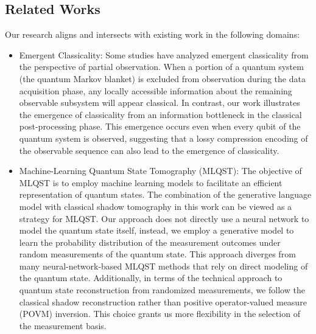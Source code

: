 \documentclass[fleqn,11pt]{wlscirep}
\begin{document}
\subsection*{Related Works}

Our research aligns and intersects with existing work in the following domains:
\begin{itemize}
\item Emergent Classicality: Some studies \cite{Brandao2015G1310.8640, Foti2019W1810.10261, Qi2021E2001.01507, Coppo2022T2203.13587} have analyzed emergent classicality from the perspective of partial observation. When a portion of a quantum system (the quantum Markov blanket) is excluded from observation during the data acquisition phase, any locally accessible information about the remaining observable subsystem will appear classical. In contrast, our work illustrates the emergence of classicality from an information bottleneck in the classical post-processing phase. This emergence occurs even when every qubit of the quantum system is observed, suggesting that a lossy compression encoding of the observable sequence can also lead to the emergence of classicality.

\item Machine-Learning Quantum State Tomography (MLQST): The objective of MLQST is to employ machine learning models to facilitate an efficient representation of quantum states. The combination of the generative language model with classical shadow tomography in this work can be viewed as a strategy for MLQST. Our approach does not directly use a neural network to model the quantum state itself, instead, we employ a generative model to learn the probability distribution of the measurement outcomes under random measurements of the quantum state. This approach diverges from many neural-network-based MLQST methods \cite{Torlai2017N1703.05334, Torlai2018L1801.09684, Xu2018N1811.06654, Torlai2019I1904.08441, Neugebauer2020N2007.16185, Ahmed2021Q2008.03240, Koutny2022N2206.06736} that rely on direct modeling of the quantum state. Additionally, in terms of the technical approach to quantum state reconstruction from randomized measurements, we follow the classical shadow reconstruction rather than positive operator-valued measure (POVM) inversion\cite{Carrasquilla2018R1810.10584, Carrasquilla2021P1912.11052, Cha2022A2006.12469}. This choice grants us more flexibility in the selection of the measurement basis.


\end{itemize}
\end{document}
